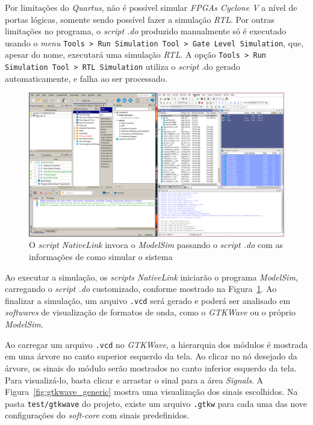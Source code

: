     { Por limitações do \textit{Quartus}, não é possível simular
        \textit{FPGAs Cyclone V} a nível de portas lógicas, somente sendo possível
        fazer a simulação \textit{RTL}. Por outras limitações no programa, o
        \textit{script .do} produzido manualmente só é executado usando o
        \textit{menu} \texttt{Tools > Run Simulation Tool > Gate Level Simulation},
        que, apesar do nome, executará uma simulação \textit{RTL}. A opção
        \texttt{Tools > Run Simulation Tool > RTL Simulation} utiliza o \textit{script}
        .do gerado automaticamente, e falha ao ser processado.
    }

    \begin{figure}[H]
    \centering
        \includegraphics[width=.75\linewidth]{../images/quartus/quartus_modelsim.png}
        \caption{O \textit{script NativeLink} invoca o \textit{ModelSim} passando
            o \textit{script .do} com as informações de como simular o sistema}
        \label{fig:quartus_modelsim}
    \end{figure}

    { Ao executar a simulação, os \textit{scripts NativeLink} iniciarão o
        programa \textit{ModelSim}, carregando o \textit{script .do} customizado,
        conforme mostrado na Figura~\ref{fig:quartus_modelsim}. Ao finalizar a
        simulação, um arquivo \texttt{.vcd} será gerado e poderá ser analisado
        em \textit{softwares} de visualização de formatos de onda, como o
        \textit{GTKWave} ou o próprio \textit{ModelSim}.
    }

    { Ao carregar um arquivo \texttt{.vcd} no \textit{GTKWave}, a hierarquia
        dos módulos é mostrada em uma árvore no canto superior esquerdo da tela.
        Ao clicar no nó desejado da árvore, os sinais do módulo serão mostrados
        no canto inferior esquerdo da tela. Para visualizá-lo, basta clicar e
        arrastar o sinal para a área \textit{Signals}. A Figura~\ref{fig:gtkwave_generic}
        mostra uma visualização dos sinais escolhidos. Na pasta \texttt{test/gtkwave}
        do projeto, existe um arquivo \texttt{.gtkw} para cada uma das nove
        configurações do \textit{soft-core} com sinais predefinidos.
    }

